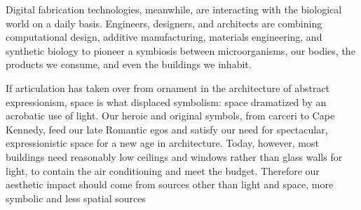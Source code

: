 


Digital fabrication technologies, meanwhile, are interacting with the biological world on a daily basis.
Engineers, designers, and architects are combining computational design, additive manufacturing, materials engineering, and synthetic biology to pioneer a symbiosis between microorganisms, our bodies, the products we consume, and even the buildings we inhabit\cite{Schwab2016}.


    If articulation has taken over from ornament in the architecture of abstract expressionism, space is what displaced symbolism: space dramatized by an acrobatic use of light.
    Our heroic and original symbols, from carceri to Cape Kennedy, feed our late Romantic egos and satisfy our need for spectacular, expressionistic space for a new age in architecture.
    Today, however, most buildings need reasonably low ceilings and windows rather than glass walls for light, to contain the air conditioning and meet the budget.
    Therefore our aesthetic impact should come from sources other than light and space, more symbolic and less spatial sources\cite{Venturi1971}

